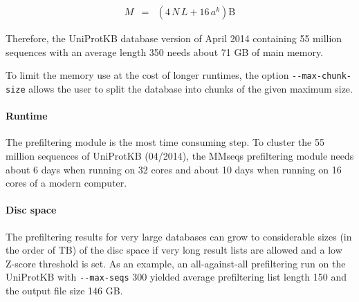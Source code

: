 \documentclass[11pt,a4paper]{report}
\begin{document}
\begin{eqnarray*}
M & = & (4\, N\, L+16\, a^{k})\mathrm{B}\end{eqnarray*}
 

Therefore, the UniProtKB database version of April 2014 containing
55 million sequences with an average length 350 needs about 71 GB
of main memory. 

To limit the memory use at the cost of longer runtimes, the option
\texttt{-{}-max-chunk-size} allows the user to split the database
into chunks of the given maximum size. 


\paragraph{Runtime}

The prefiltering module is the most time consuming step. To cluster
the 55 million sequences of UniProtKB (04/2014), the MMseqs prefiltering
module needs about 6 days when running on 32 cores and about 10 days
when running on 16 cores of a modern computer.


\paragraph{Disc space}

The prefiltering results for very large databases can grow to considerable
sizes (in the order of TB) of the disc space if very long result lists
are allowed and a low Z-score threshold is set. As an example, an
all-against-all prefiltering run on the UniProtKB with \texttt{-{}-max-seqs}
300 yielded average prefiltering list length 150 and the output file
size 146 GB.
\end{document}
